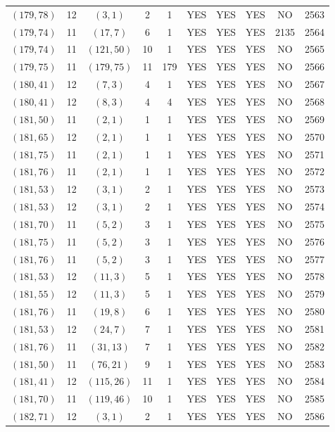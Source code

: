 \begin{longtable}{|c|c|c|c|c|c|c|c|c|c|}
$(179, 78)$ & 12 & $(3, 1)$ & 2 & 1 & YES & YES & YES & NO & 2563\\
$(179, 74)$ & 11 & $(17, 7)$ & 6 & 1 & YES & YES & YES & 2135 & 2564\\
$(179, 74)$ & 11 & $(121, 50)$ & 10 & 1 & YES & YES & YES & NO & 2565\\
$(179, 75)$ & 11 & $(179, 75)$ & 11 & 179 & YES & YES & YES & NO & 2566\\
$(180, 41)$ & 12 & $(7, 3)$ & 4 & 1 & YES & YES & YES & NO & 2567\\
$(180, 41)$ & 12 & $(8, 3)$ & 4 & 4 & YES & YES & YES & NO & 2568\\
$(181, 50)$ & 11 & $(2, 1)$ & 1 & 1 & YES & YES & YES & NO & 2569\\
$(181, 65)$ & 12 & $(2, 1)$ & 1 & 1 & YES & YES & YES & NO & 2570\\
$(181, 75)$ & 11 & $(2, 1)$ & 1 & 1 & YES & YES & YES & NO & 2571\\
$(181, 76)$ & 11 & $(2, 1)$ & 1 & 1 & YES & YES & YES & NO & 2572\\
$(181, 53)$ & 12 & $(3, 1)$ & 2 & 1 & YES & YES & YES & NO & 2573\\
$(181, 53)$ & 12 & $(3, 1)$ & 2 & 1 & YES & YES & YES & NO & 2574\\
$(181, 70)$ & 11 & $(5, 2)$ & 3 & 1 & YES & YES & YES & NO & 2575\\
$(181, 75)$ & 11 & $(5, 2)$ & 3 & 1 & YES & YES & YES & NO & 2576\\
$(181, 76)$ & 11 & $(5, 2)$ & 3 & 1 & YES & YES & YES & NO & 2577\\
$(181, 53)$ & 12 & $(11, 3)$ & 5 & 1 & YES & YES & YES & NO & 2578\\
$(181, 55)$ & 12 & $(11, 3)$ & 5 & 1 & YES & YES & YES & NO & 2579\\
$(181, 76)$ & 11 & $(19, 8)$ & 6 & 1 & YES & YES & YES & NO & 2580\\
$(181, 53)$ & 12 & $(24, 7)$ & 7 & 1 & YES & YES & YES & NO & 2581\\
$(181, 76)$ & 11 & $(31, 13)$ & 7 & 1 & YES & YES & YES & NO & 2582\\
$(181, 50)$ & 11 & $(76, 21)$ & 9 & 1 & YES & YES & YES & NO & 2583\\
$(181, 41)$ & 12 & $(115, 26)$ & 11 & 1 & YES & YES & YES & NO & 2584\\
$(181, 70)$ & 11 & $(119, 46)$ & 10 & 1 & YES & YES & YES & NO & 2585\\
$(182, 71)$ & 12 & $(3, 1)$ & 2 & 1 & YES & YES & YES & NO & 2586\\

\end{longtable}
